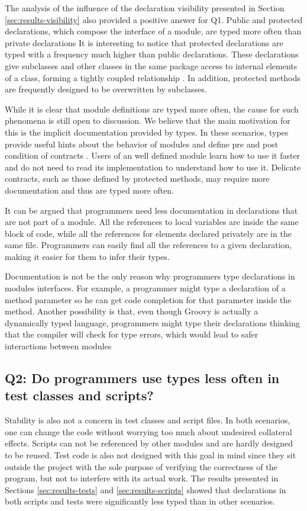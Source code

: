 \documentclass[preprint]{sigplanconf}
\begin{document}
The analysis of the influence of the declaration visibility presented in Section \ref{sec:results-visibility} also provided a positive answer for Q1.
Public and protected declarations, which compose the interface of a module, are typed more often than private declarations
It is interesting to notice that protected declarations are typed with a frequency much higher than public declarations.
These declarations give subclasses and other classes in the same package access to internal elements of a class, forming a tightly coupled relationship \cite{Chidamber94}.
In addition, protected methods are frequently designed to be overwritten by subclasses.

While it is clear that module definitions are typed more often, the cause for such phenomena is still open to discussion.
We believe that the main motivation for this is the implicit documentation provided by types.
In these scenarios, types provide useful hints about the behavior of modules \cite{Curtis1987} and define pre and post condition of contracts
\cite{Meyer88, Meijer04, Wadler04, Plosch97, Flanagan2006, Furr09}.
Users of an well defined module learn how to use it faster and do not need to read its implementation to understand how to use it.
Delicate contracts, such as those defined by protected methods, may require more documentation and thus are typed more often.


It can be argued that programmers need less documentation in declarations that are not part of a module.
All the references to local variables are inside the same block of code, while all the references for elements declared privately are in the same file.
Programmers can easily find all the references to a given declaration, making it easier for them to infer their types.

Documentation is not be the only reason why programmers type declarations in modules interfaces.
For example, a programmer might type a declaration of a method parameter so he can get code completion for that parameter inside the method.
Another possibility is that, even though Groovy is actually a dynamically typed language, programmers might type their declarations thinking that the compiler will check for type errors, which would lead to safer interactions between modules



\subsection*{Q2: Do programmers use types less often in test classes and scripts?\label{discussion-q2}}
Stability is also not a concern in test classes and script files.
In both scenarios, one can change the code without worrying too much about undesired collateral effects.
Scripts can not be referenced by other modules and are hardly designed to be reused.
Test code is also not designed with this goal in mind since they sit outside the project with the sole purpose of verifying the correctness of the program, but not to interfere with its actual work.
The results presented in Sections \ref{sec:results-tests} and \ref{sec:results-scripts} showed that declarations in both scripts and tests were significantly less typed than in other scenarios.
\end{document}
